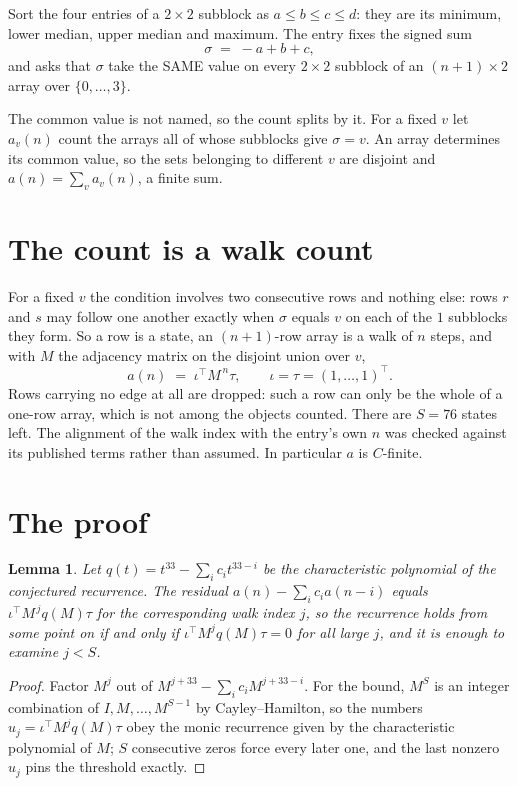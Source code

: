 \documentclass[11pt,a4paper]{article}
\theoremstyle{plain}
\newtheorem{lemma}[theorem]{Lemma}
\theoremstyle{definition}
\begin{document}
Sort the four entries of a $2\times2$ subblock as $a\le b\le c\le d$: they
are its minimum, lower median, upper median and maximum. The entry fixes the signed sum
\[
\sigma\;=\;-a+b+c,
\]
and asks that $\sigma$ take the SAME value on every $2\times2$ subblock of an
$(n+1)\times2$ array over $\{0,\dots,3\}$.

The common value is not named, so the count splits by it. For a fixed $v$ let $a_v(n)$ count
the arrays all of whose subblocks give $\sigma=v$. An array determines its common value, so
the sets belonging to different $v$ are disjoint and $a(n)=\sum_v a_v(n)$, a finite sum.


\section{The count is a walk count}

For a fixed $v$ the condition involves two consecutive rows and nothing
else: rows $r$ and $s$ may follow one another exactly when $\sigma$ equals $v$ on each of the
$1$ subblocks they form. So a row is a state, an $(n+1)$-row array is a walk of $n$
steps, and with $M$ the adjacency matrix on the disjoint union over $v$,
\[
a(n)\;=\;\iota^{\!\top}M^{\,n}\tau,\qquad\iota=\tau=(1,\dots,1)^{\!\top} .
\]
Rows carrying no edge at all are dropped: such a row can only be the whole of a one-row
array, which is not among the objects counted. There are $S=76$ states left.
The alignment of the walk index with the entry's own $n$ was checked against its published
terms rather than assumed. In particular $a$ is $C$-finite.

\section{The proof}

\begin{lemma}\label{lem:crit}
Let $q(t)=t^{33}-\sum_i c_it^{33-i}$ be the characteristic polynomial of the
conjectured recurrence. The residual $a(n)-\sum_ic_ia(n-i)$ equals
$\iota^{\!\top}M^{\,j}q(M)\tau$ for the corresponding walk index $j$, so the recurrence
holds from some point on if and only if $\iota^{\!\top}M^{j}q(M)\tau=0$ for all large $j$,
and it is enough to examine $j<S$.
\end{lemma}

\begin{proof}
Factor $M^{j}$ out of $M^{j+33}-\sum_ic_iM^{j+33-i}$. For the bound, $M^{S}$
is an integer combination of $I,M,\dots,M^{S-1}$ by Cayley--Hamilton, so the numbers
$u_j=\iota^{\!\top}M^{j}q(M)\tau$ obey the monic recurrence given by the characteristic
polynomial of $M$; $S$ consecutive zeros force every later one, and the last nonzero $u_j$
pins the threshold exactly.
\end{proof}
\end{document}
